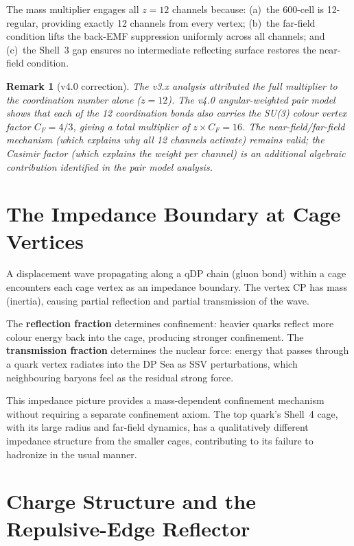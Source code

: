 \documentclass[11pt,letterpaper]{article}
\newtheorem{remark}[theorem]{Remark}
\begin{document}
The mass multiplier engages all $z = 12$ channels because:
(a)~the 600-cell is 12-regular, providing exactly 12 channels from
every vertex; (b)~the far-field condition lifts the back-EMF
suppression uniformly across all channels; and (c)~the Shell~3 gap
ensures no intermediate reflecting surface restores the near-field
condition.

\begin{remark}[v4.0 correction]
The v3.x analysis attributed the full multiplier to the
coordination number alone ($z = 12$).  The v4.0 angular-weighted
pair model shows that each of the 12 coordination bonds also
carries the SU(3) colour vertex factor $C_F = 4/3$, giving a total
multiplier of $z \times C_F = 16$.  The near-field/far-field
mechanism (which explains \emph{why} all 12 channels activate)
remains valid; the Casimir factor (which explains the
\emph{weight per channel}) is an additional algebraic contribution
identified in the pair model analysis.
\end{remark}

\section{The Impedance Boundary at Cage Vertices}
\label{app:impedance}

A displacement wave propagating along a qDP chain (gluon bond)
within a cage encounters each cage vertex as an impedance boundary.
The vertex CP has mass (inertia), causing partial reflection and
partial transmission of the wave.

The \textbf{reflection fraction} determines confinement: heavier
quarks reflect more colour energy back into the cage, producing
stronger confinement.  The \textbf{transmission fraction} determines
the nuclear force: energy that passes through a quark vertex
radiates into the DP Sea as SSV perturbations, which neighbouring
baryons feel as the residual strong force.

This impedance picture provides a mass-dependent confinement
mechanism without requiring a separate confinement axiom.  The
top quark's Shell~4 cage, with its large radius and far-field
dynamics, has a qualitatively different impedance structure from
the smaller cages, contributing to its failure to hadronize in the
usual manner.

\section{Charge Structure and the Repulsive-Edge Reflector}
\label{app:charge}
\end{document}
